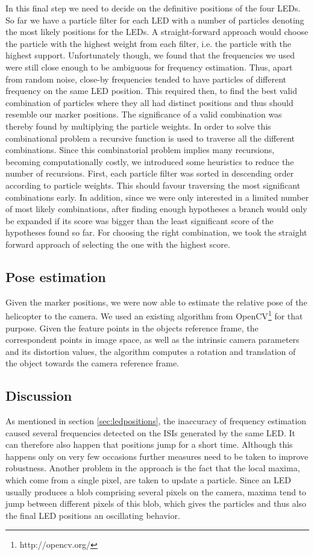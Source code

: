 In this final step we need to decide on the definitive positions of the four LEDs. So far we have a particle filter for each LED with a number of particles denoting the most likely positions for the LEDs. A straight-forward approach would choose the particle with the highest weight from each filter, i.e. the particle with the highest support. Unfortunately though, we found that the frequencies we used were still close enough to be ambiguous for frequency estimation. Thus, apart from random noise, close-by frequencies tended to have particles of different frequency on the same LED position. This required then, to find the best valid combination of particles where they all had distinct positions and thus should resemble our marker positions. The significance of a valid combination was thereby found by multiplying the particle weights.
In order to solve this combinational problem a recursive function is used to traverse all the different combinations. Since this combinatorial problem implies many recursions, becoming computationally costly, we introduced some heuristics to reduce the number of recursions. First, each particle filter was sorted in descending order according to particle weights. This should favour traversing the most significant combinations early. In addition, since we were only interested in a limited number of most likely combinations, after finding enough hypotheses a branch would only be expanded if its score was bigger than the least significant score of the hypotheses found so far. For choosing the right combination, we took the straight forward approach of selecting the one with the highest score. 

\subsection{Pose estimation}\label{sec:poseestimation}

Given the marker positions, we were now able to estimate the relative pose of the helicopter to the camera. We used an existing algorithm from OpenCV\footnote{http://opencv.org/} for that purpose. Given the feature points in the objects reference frame, the correspondent points in image space, as well as the intrinsic camera parameters and its distortion values, the algorithm computes a rotation and translation of the object towards the camera reference frame.

\subsection{Discussion}\label{sec:approach_discussion}

As mentioned in section \ref{sec:ledpositions}, the inaccuracy of frequency estimation caused several frequencies detected on the ISIs generated by the same LED. It can therefore also happen that positions jump for a short time. Although this happens only on very few occasions further measures need to be taken to improve robustness. Another problem in the approach is the fact that the local maxima, which come from a single pixel, are taken to update a particle. Since an LED usually produces a blob comprising several pixels on the camera, maxima tend to jump between different pixels of this blob, which gives the particles and thus also the final LED positions an oscillating behavior.
